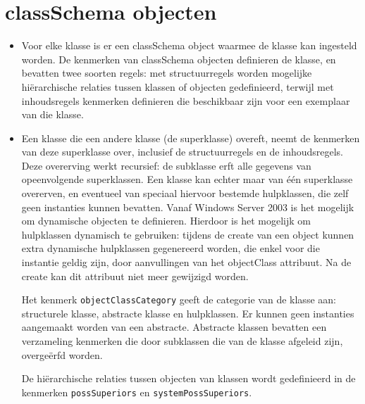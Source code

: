 	\section{classSchema objecten }
	\begin{enumerate}
		 { 
			\begin{itemize}
				\item Voor elke klasse is er een classSchema object waarmee de klasse kan ingesteld worden. De kenmerken van classSchema objecten definieren de klasse, en bevatten twee soorten regels: met structuurregels worden mogelijke hiërarchische relaties tussen klassen of objecten gedefinieerd, terwijl met inhoudsregels kenmerken definieren die beschikbaar zijn voor een exemplaar van die klasse.
			\end{itemize}	
		}
		
		 {
			\begin{itemize}
				\item Een klasse die een andere klasse (de superklasse) overeft, neemt de kenmerken van deze superklasse over, inclusief de structuurregels en de inhoudsregels. Deze overerving werkt recursief: de subklasse erft alle gegevens van opeenvolgende superklassen. Een klasse kan echter maar van één superklasse overerven, en eventueel van speciaal hiervoor bestemde hulpklassen, die zelf geen instanties kunnen bevatten. Vanaf Windows Server 2003 is het mogelijk om dynamische objecten te definieren. Hierdoor is het mogelijk om hulpklassen dynamisch te gebruiken: tijdens de create van een object kunnen extra dynamische hulpklassen gegenereerd worden, die enkel voor die instantie geldig zijn, door aanvullingen van het objectClass attribuut. Na de create kan dit attribuut niet meer gewijzigd worden.

				Het kenmerk \texttt{objectClassCategory} geeft de categorie van de klasse aan: structurele klasse, abstracte klasse en hulpklassen. Er kunnen geen instanties aangemaakt worden van een abstracte. Abstracte klassen bevatten een verzameling kenmerken die door subklassen die van de klasse afgeleid zijn, overgeërfd worden. 

				De hiërarchische relaties tussen objecten van klassen wordt gedefinieerd in de kenmerken \texttt{possSuperiors} en \texttt{systemPossSuperiors}. 
			\end{itemize}	
		}
		

\end{enumerate}
